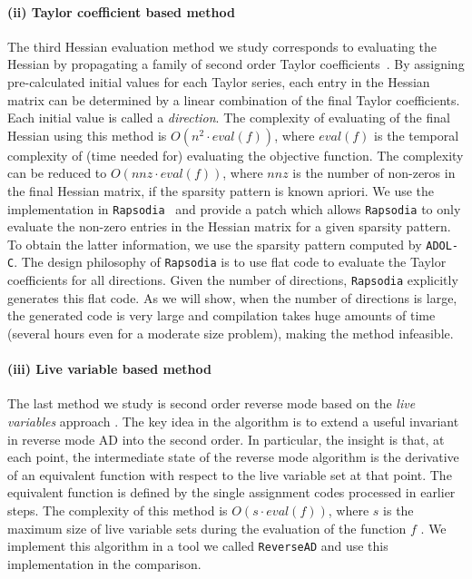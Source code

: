 \documentclass[10pt, a4paper, english]{article}
\begin{document}
\paragraph{(ii) Taylor coefficient based method} 
The third Hessian evaluation method  we study  corresponds to evaluating the Hessian by propagating a family of second order Taylor coefficients~\cite{griewank2000evaluating}. 
By assigning pre-calculated initial values for each Taylor series, each entry in the Hessian matrix  can be determined by a linear combination of the final Taylor coefficients. Each initial value is called a {\em direction}.
The complexity of evaluating of the final Hessian using this method is $O(n^2 \cdot eval(f))$, where $eval(f)$ is the temporal complexity of (time needed for) evaluating the objective function.
The complexity can be reduced to $O(nnz \cdot eval(f))$, where $nnz$ is the number of non-zeros in the final Hessian matrix, if the sparsity pattern is known apriori.
We use the implementation in {\tt Rapsodia}~\cite{charpentier2009fast} and provide a patch which allows {\tt Rapsodia} to only evaluate the non-zero entries in the Hessian matrix for a given sparsity pattern. To obtain the latter information, we use the sparsity pattern computed by {\tt ADOL-C}. The design philosophy of {\tt Rapsodia} is to use flat code to evaluate the Taylor coefficients for all directions. Given the number of directions, {\tt Rapsodia} explicitly generates this flat code. As we will show, when the number of directions is large, the generated code is very large and compilation takes huge amounts of time (several hours even for a moderate size problem), making the method infeasible. 

\paragraph{(iii) Live variable based method}
The last method we study is second order reverse mode based on the {\em live variables} approach \cite{wang2016capitalizing}. The key idea in the algorithm is to extend a useful invariant in reverse mode AD into the second order. In particular, the insight is that, at each point, the intermediate state of the reverse mode algorithm is the derivative of an equivalent function with respect to the live variable set at that point. The equivalent function is defined by the single assignment codes processed in earlier steps. 
The complexity of this method is $O(s \cdot eval(f))$, where $s$ is the maximum size of live variable sets during the evaluation of the function $f$ \cite{wang2016capitalizing}.
We implement this algorithm in a tool we called {\tt ReverseAD} and use this implementation in the comparison.
\end{document}
